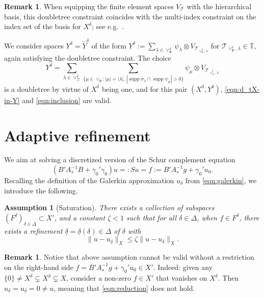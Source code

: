 \documentclass[11pt,a4paper,oneside,english]{amsart}
\numberwithin{equation}{section}
\numberwithin{theorem}{section}
\newtheorem{assum}[theorem]{Assumption}
\theoremstyle{definition}
\newtheorem{remark}[theorem]{Remark}
\DeclareMathOperator{\supp}{supp}
\newcommand{\T}{\mathcal{T}}
\newcommand{\udelta}{{\underline{\delta}}}
\begin{document}
\begin{remark}
  When equipping the finite element spaces $V_{\T}$ with the hierarchical basis,
  this doubletree constraint coincides with the multi-index constraint on the index
  set of the basis for $X^\delta$; see e.g.~\cite{TODO}.
\end{remark}

We consider spaces $Y^\delta = \tilde Y^\delta$ of the form
$Y^\delta := \sum_{\lambda \in \vee^\delta_\Psi} \psi_\lambda \otimes V_{\T_{\vee^\delta_\Psi, \lambda}}$
for $\T_{\vee^\delta_\Psi, \lambda} \in \mathbb T$, again satisfying the doubletree
constraint. The choice
\begin{equation}
  Y^\delta = \sum_{\lambda \in \vee_\Sigma^\delta} \sum_{\{\mu \in \vee_\Psi\colon |\mu|=|\lambda|,\,
  |\supp \sigma_\lambda \cap \supp \psi_\mu|>0\}} \psi_\mu \otimes V_{\T_{\vee_\Sigma^\delta,\lambda}}
  \label{eqn:generate-Ydelta}
\end{equation}
is a doubletree by virtue of $X^\delta$ being one, and for this pair $(X^\delta, Y^\delta)$,
\eqref{eqn:d_tX-in-Y} and \eqref{eqn:inclusion} are valid.

\section{Adaptive refinement}
We aim at solving a discretized version of the Schur complement equation
\begin{equation}
  \label{eqn:schur}
 (B' A_s^{-1} B + \gamma_0' \gamma_0)u =: Su = f := B' A_s^{-1}g+\gamma_0' u_0.
\end{equation}
Recalling the definition of the Galerkin approximation $u_\delta$ from \eqref{eqn:galerkin},
we introduce the following.


\begin{assum}[Saturation] \label{assum:saturation}
There exists a collection of subspaces $(F^\delta)_{\delta \in \Delta} \subset X'$, and
a constant $\zeta<1$ such that for all $\delta \in \Delta$, when $f \in F^\delta$,
  there exists a refinement $\udelta = \udelta(\delta) \in \Delta$ of $\delta$ with
\begin{equation}
  \label{eqn:reduction}
  \|u-u_\udelta\|_X \leq \zeta \|u-u_\delta\|_X.
\end{equation}
\end{assum}
\begin{remark} \label{data-oscillation}
  Notice that above assumption cannot be valid without a restriction on the
  right-hand side $f =B' A_s^{-1}g+\gamma_0' u_0\in X'$. Indeed: given any
  $\{0\} \neq X^\delta \subsetneq X^{\udelta} \subsetneq X$, consider a non-zero
  $f \in X'$ that vanishes on $X^{\udelta}$. Then $u_\delta=u_\udelta=0 \neq u$,
  meaning that \eqref{eqn:reduction} does not hold. 
\end{remark}
\end{document}
